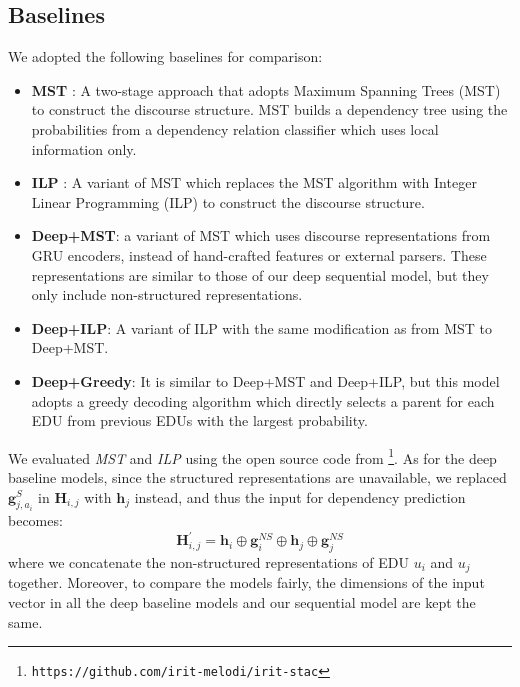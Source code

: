 \documentclass[letterpaper]{article} \usepackage{aaai19}  \usepackage{times}  \usepackage{helvet}  \usepackage{courier}  \usepackage{url}  \usepackage{graphicx}  \usepackage{amssymb}
\begin{document}
\subsection{Baselines}

We adopted the following baselines for comparison:

\begin{itemize}
    \item \textbf{MST} \cite{afantenos2015discourse}: A two-stage approach that adopts Maximum Spanning Trees (MST) to construct the discourse structure. MST builds a dependency tree using the probabilities from a dependency relation classifier which uses local information only.
    \item \textbf{ILP} \cite{perret2016integer} : A variant of MST which replaces the MST algorithm with Integer Linear Programming (ILP) to construct the discourse structure.
    \item \textbf{Deep+MST}: a variant of MST  which uses discourse representations from GRU encoders, instead of hand-crafted features or external parsers. 
    These representations are similar to those of our deep sequential model, but they only include non-structured representations.
    \item \textbf{Deep+ILP}: A variant of  ILP with the same modification as from MST to Deep+MST.
    \item \textbf{Deep+Greedy}: It is similar to Deep+MST and Deep+ILP, but this model adopts a greedy decoding algorithm which directly selects a parent for each EDU from previous EDUs with the largest probability.
\end{itemize}

We evaluated \emph{MST} and \emph{ILP} using the open source code from \cite{afantenos2015discourse,perret2016integer}\footnote{\texttt{https://github.com/irit-melodi/irit-stac}}. As for the deep baseline models, since the structured representations are unavailable, we replaced $\bm{g}^S_{j,a_i}$ in $\bm{H}_{i,j}$ with $\bm{h}_j$ instead, and thus the input for dependency prediction becomes:
\begin{equation}
    \bm{H}_{i,j}^{'} = \bm{h}_i \oplus \bm{g}^{NS}_i \oplus \bm{h}_j \oplus \bm{g}^{NS}_j
    \label{H_input_baseline}
\end{equation}
where we concatenate the non-structured representations of EDU $u_i$ and $u_j$ together.
Moreover, to compare the models fairly, the dimensions of the input vector in all the deep baseline models and our sequential model are kept the same.
\end{document}
